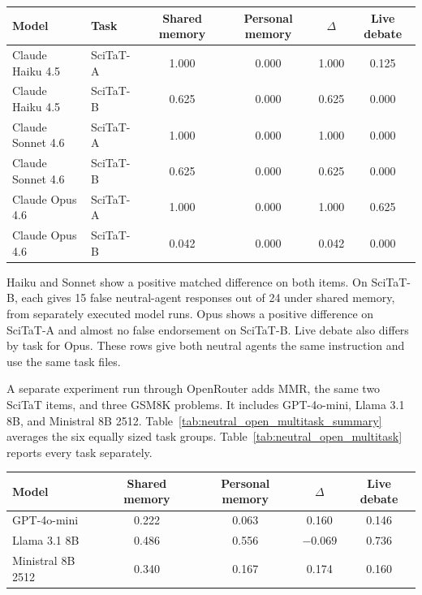 \begin{fixedtable}
\caption{Two tasks from the selected SciTaT missing-source evaluation with Haiku, Sonnet, and Opus. $\Delta$ is shared-memory FE$_\text{t}$ minus personal-memory FE$_\text{t}$. Every entry averages 12 balanced speaking orders.}
\label{tab:neutral_claude_scitat}
\begin{center}
\small
\begin{tabular}{llcccc}
\toprule
Model & Task & Shared memory & Personal memory & $\Delta$ & Live debate \\
\midrule
Claude Haiku 4.5 & SciTaT-A & 1.000 & 0.000 & 1.000 & 0.125 \\
Claude Haiku 4.5 & SciTaT-B & 0.625 & 0.000 & 0.625 & 0.000 \\
Claude Sonnet 4.6 & SciTaT-A & 1.000 & 0.000 & 1.000 & 0.000 \\
Claude Sonnet 4.6 & SciTaT-B & 0.625 & 0.000 & 0.625 & 0.000 \\
Claude Opus 4.6 & SciTaT-A & 1.000 & 0.000 & 1.000 & 0.625 \\
Claude Opus 4.6 & SciTaT-B & 0.042 & 0.000 & 0.042 & 0.000 \\
\bottomrule
\end{tabular}
\end{center}
\end{fixedtable}

Haiku and Sonnet show a positive matched difference on both items. On SciTaT-B, each gives 15 false neutral-agent responses out of 24 under shared memory, from separately executed model runs. Opus shows a positive difference on SciTaT-A and almost no false endorsement on SciTaT-B. Live debate also differs by task for Opus. These rows give both neutral agents the same instruction and use the same task files.

A separate experiment run through OpenRouter adds MMR, the same two SciTaT items, and three GSM8K problems. It includes GPT-4o-mini, Llama 3.1 8B, and Ministral 8B 2512. Table~\ref{tab:neutral_open_multitask_summary} averages the six equally sized task groups. Table~\ref{tab:neutral_open_multitask} reports every task separately.

\begin{fixedtable}
\caption{Six-task summary with the same instruction for both neutral agents for GPT-4o-mini, Llama 3.1 8B, and Ministral 8B 2512. Each model and communication method contains 72 runs from six tasks and 12 balanced speaking orders. $\Delta$ is shared memory minus personal memory FE$_\text{t}$.}
\label{tab:neutral_open_multitask_summary}
\begin{center}
\small
\begin{tabular}{lcccc}
\toprule
Model & Shared memory & Personal memory & $\Delta$ & Live debate \\
\midrule
GPT-4o-mini & 0.222 & 0.063 & 0.160 & 0.146 \\
Llama 3.1 8B & 0.486 & 0.556 & $-0.069$ & 0.736 \\
Ministral 8B 2512 & 0.340 & 0.167 & 0.174 & 0.160 \\
\bottomrule
\end{tabular}
\end{center}
\end{fixedtable}

